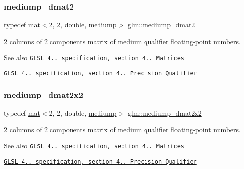 \subsubsection{\texorpdfstring{mediump\+\_\+dmat2}{mediump\_dmat2}}
{\footnotesize\ttfamily typedef \mbox{\hyperlink{structglm_1_1mat}{mat}}$<$2, 2, double, \mbox{\hyperlink{namespaceglm_a36ed105b07c7746804d7fdc7cc90ff25a6416f3ea0c9025fb21ed50c4d6620482}{mediump}}$>$ \mbox{\hyperlink{group__core__precision_gadbf2ed2cfb596bd2ca7e980777c0acde}{glm\+::mediump\+\_\+dmat2}}}

2 columns of 2 components matrix of medium qualifier floating-\/point numbers.

\begin{DoxySeeAlso}{See also}
\href{http://www.opengl.org/registry/doc/GLSLangSpec.4.20.8.pdf}{\tt G\+L\+SL 4.. specification, section 4.. Matrices} 

\href{http://www.opengl.org/registry/doc/GLSLangSpec.4.20.8.pdf}{\tt G\+L\+SL 4.. specification, section 4.. Precision Qualifier} 
\end{DoxySeeAlso}
\mbox{\label{group__core__precision_ga3d91f269872b4664d2f500b6dee986eb}} 
\subsubsection{\texorpdfstring{mediump\+\_\+dmat2x2}{mediump\_dmat2x2}}
{\footnotesize\ttfamily typedef \mbox{\hyperlink{structglm_1_1mat}{mat}}$<$2, 2, double, \mbox{\hyperlink{namespaceglm_a36ed105b07c7746804d7fdc7cc90ff25a6416f3ea0c9025fb21ed50c4d6620482}{mediump}}$>$ \mbox{\hyperlink{group__core__precision_ga3d91f269872b4664d2f500b6dee986eb}{glm\+::mediump\+\_\+dmat2x2}}}

2 columns of 2 components matrix of medium qualifier floating-\/point numbers.

\begin{DoxySeeAlso}{See also}
\href{http://www.opengl.org/registry/doc/GLSLangSpec.4.20.8.pdf}{\tt G\+L\+SL 4.. specification, section 4.. Matrices} 

\href{http://www.opengl.org/registry/doc/GLSLangSpec.4.20.8.pdf}{\tt G\+L\+SL 4.. specification, section 4.. Precision Qualifier} 
\end{DoxySeeAlso}
\mbox{\label{group__core__precision_gaf3a6e61247ffcbbf9211186d0d250a2b}} 
